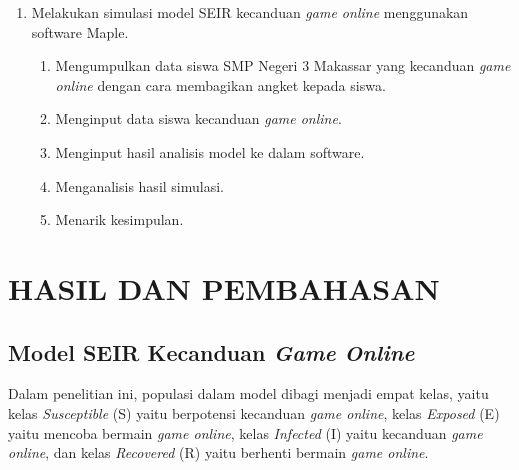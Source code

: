 \documentclass[a4paper, 12pt]{article}
\newcommand{\runninghead}[1]{%
  \fancyhead[L]{#1}
  \fancyhead[R]{\thepage}
}
\begin{document}
\clearpage
\runninghead{Side (2020)}
\setcounter{page}{95}

\begin{enumerate}[resume]
    \item Melakukan simulasi model SEIR kecanduan \textit{game online} menggunakan software Maple.
    \begin{enumerate}[label=\alph*.]
        \item Mengumpulkan data siswa SMP Negeri 3 Makassar yang kecanduan \textit{game online} dengan cara membagikan angket kepada siswa.
        \item Menginput data siswa kecanduan \textit{game online}.
        \item Menginput hasil analisis model ke dalam software.
        \item Menganalisis hasil simulasi.
        \item Menarik kesimpulan.
    \end{enumerate}
\end{enumerate}

\section{HASIL DAN PEMBAHASAN}
\subsection{Model SEIR Kecanduan \textit{Game Online}}
Dalam penelitian ini, populasi dalam model dibagi menjadi empat kelas, yaitu kelas \textit{Susceptible} (S) yaitu berpotensi kecanduan \textit{game online}, kelas \textit{Exposed} (E) yaitu mencoba bermain \textit{game online}, kelas \textit{Infected} (I) yaitu kecanduan \textit{game online}, dan kelas \textit{Recovered} (R) yaitu berhenti bermain \textit{game online}.
\end{document}
